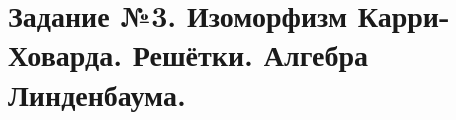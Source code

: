 \documentclass[10pt,a4paper,oneside]{article}
\begin{document}
\begin{enumerate}

\end{enumerate}

\section*{Задание №3. Изоморфизм Карри-Ховарда. Решётки. Алгебра Линденбаума.}
\end{document}

